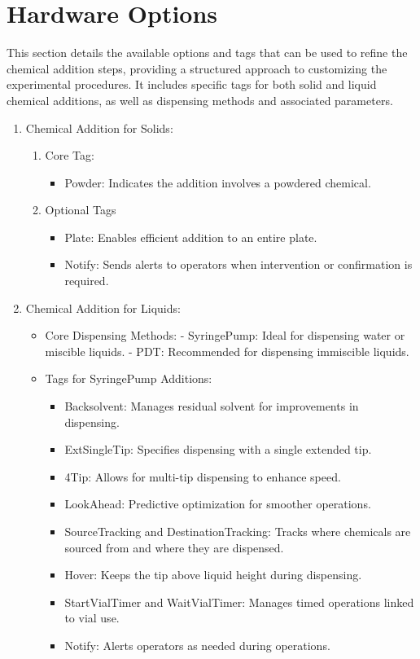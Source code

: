 \documentclass[sn-nature, twocolumn]{sn-jnl}%
\theoremstyle{thmstyleone}%
\theoremstyle{thmstyletwo}%
\theoremstyle{thmstylethree}%
\begin{document}
\clearpage
\section{Hardware Options}
This section details the available options and tags that can be used to refine the chemical addition steps, providing a structured approach to customizing the experimental procedures. It includes specific tags for both solid and liquid chemical additions, as well as dispensing methods and associated parameters.

\begin{enumerate}
    \item Chemical Addition for Solids:
    \begin{enumerate}
        \item  Core Tag:
        \begin{itemize}
            \item Powder: Indicates the addition involves a powdered chemical.
        \end{itemize}

        \item Optional Tags
        \begin{itemize}
            \item Plate: Enables efficient addition to an entire plate.
            \item Notify: Sends alerts to operators when intervention or confirmation is required.
        \end{itemize}

    \end{enumerate}


    \item Chemical Addition for Liquids:

    \begin{itemize}
        \item Core Dispensing Methods:
      - SyringePump: Ideal for dispensing water or miscible liquids.
      - PDT: Recommended for dispensing immiscible liquids.
        \item Tags for SyringePump Additions:
        \begin{itemize}
            \item Backsolvent: Manages residual solvent for improvements in dispensing.
            \item ExtSingleTip: Specifies dispensing with a single extended tip.
      \item 4Tip: Allows for multi-tip dispensing to enhance speed.
      \item LookAhead: Predictive optimization for smoother operations.
      \item SourceTracking and DestinationTracking: Tracks where chemicals are sourced from and where they are dispensed.
      \item Hover: Keeps the tip above liquid height during dispensing.
      \item StartVialTimer and WaitVialTimer: Manages timed operations linked to vial use.
      \item Notify: Alerts operators as needed during operations.
        \end{itemize}


\end{itemize}
\end{enumerate}
\end{document}
